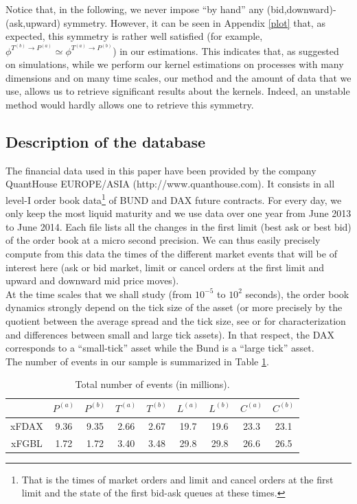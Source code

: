 \documentclass[a4paper,11pt]{article}
\newcommand{\PA}{P^{(a)}}
\newcommand{\PB}{P^{(b)}}
\newcommand{\TA}{T^{(a)}}
\newcommand{\TB}{T^{(b)}}
\newcommand{\CA}{C^{(a)}}
\newcommand{\CB}{C^{(b)}}
\newcommand{\LA}{L^{(a)}}
\newcommand{\LB}{L^{(b)}}
\begin{document}
\noindent Notice that, in the following, we never impose ``by hand'' any (bid,downward)-(ask,upward) symmetry. However, it can be seen in Appendix \ref{plot} that, as expected, this symmetry is rather well satisfied (for example, $\phi^{\TB\rightarrow \PA}\simeq \phi^{\TA\rightarrow \PB}$) in our estimations. This indicates that, as suggested on simulations, while we perform our kernel estimations on processes with many dimensions and on many time scales, our method and the amount of data that we use, allows us to retrieve significant results about the kernels. Indeed, an unstable method would hardly allows one 
to retrieve this symmetry.



\subsection{Description of the database}
\label{data}
The financial data used in this paper have been provided by the company QuantHouse EUROPE/ASIA (http://www.quanthouse.com). It consists in all level-I order book data\footnote{That is the times of market orders and limit and cancel orders at the first limit and the state of the first bid-ask queues at these times.} of BUND and DAX future contracts. For every day, we only keep the most liquid maturity and we use data over one year from June 2013 to June 2014. Each file lists all the changes in the first limit (best ask or best bid) of the order book at a micro second precision. We can thus easily precisely compute from this data the times of the different market events that will be of interest here (ask or bid market, limit or cancel orders at the first limit and upward and downward mid price moves).\\


\noindent At the time scales that we shall study (from $10^{-5}$ to $10^2$ seconds), the order book dynamics strongly depend on the tick size of the asset (or more precisely by the quotient between the average spread and the tick size, see \cite{bouchaud2009markets} or \cite{dayri2012large} for characterization and differences between small and large tick assets). In that respect, the DAX corresponds to a ``small-tick'' asset while
the Bund is a ``large tick'' asset.\\

\noindent The number of events in our sample is summarized in Table \ref{ttN}.
\begin{table}[H]
\begin{center}
\begin{tabular}{|c|c|c|c|c|c|c|c|c|}
\hline
&$\PA$&$\PB$&$\TA$&$\TB$&$\LA$&$\LB$&$\CA$&$\CB$\\
\hline
xFDAX &9.36 & 9.35 & 2.66 & 2.67 & 19.7 & 19.6 & 23.3 & 23.1\\
\hline
xFGBL &1.72 & 1.72 & 3.40 & 3.48 & 29.8 & 29.8 & 26.6 & 26.5 \\
\hline
\end{tabular}
\end{center}
\caption{Total number of events (in millions).}
\label{ttN}
\end{table}
\end{document}
